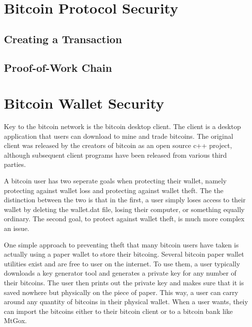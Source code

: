 \documentclass{report}
\begin{document}

\section*{Bitcoin Protocol Security}
\subsection*{Creating a Transaction}
\subsection*{Proof-of-Work Chain}

\section*{Bitcoin Wallet Security}
Key to the bitcoin network is the bitcoin desktop client.  The client is a desktop
application that users can download to mine and trade bitcoins.  The original client
was released by the creators of bitcoin as an open source c++ project\cite{Andresen:source}, although
subsequent client programs have been released from various third parties.  

A bitcoin user has two seperate goals when protecting their wallet, namely protecting
against wallet loss and protecting against wallet theft.  The the distinction between 
the two is that in the first, a user simply loses access to their wallet by deleting 
the wallet.dat file, losing their computer, or something equally ordinary.  The second 
goal, to protect against wallet theft, is much more complex an issue.

One simple approach to preventing theft that many bitcoin users have taken is actually 
using a paper wallet to store their bitcoing.  Several bitcoin paper wallet utilities 
exist and are free to user on the internet.  To use them, a user typically downloads a 
key generator tool and generates a private key for any number of their bitcoins.  The 
user then prints out the private key and makes sure that it is saved nowhere but 
physically on the piece of paper.  This way, a user can carry around any quantity of 
bitcoins in their physical wallet.  When a user wants, theiy can import the bitcoins 
either to their bitcoin client or to a bitcoin bank like MtGox.
\end{document}
